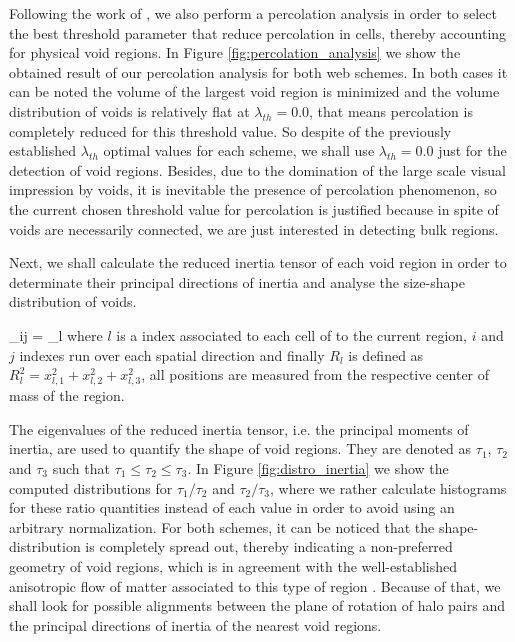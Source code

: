 \documentclass[usenatbib]{latex/mn2e}
\begin{document}
Following the work of , we also perform a 
percolation analysis in order to select the best threshold parameter that
reduce percolation in cells, thereby accounting for physical void regions.
In Figure \ref{fig:percolation_analysis} we show the obtained result 
of our percolation analysis for both web schemes. In both cases it can be 
noted the volume of the largest void region is minimized and the volume 
distribution of voids is relatively flat at $\lambda_{th} = 0.0$, that 
means percolation is completely reduced for this threshold value. So 
despite of the previously established $\lambda_{th}$ optimal values for 
each scheme, we shall use $\lambda_{th} = 0.0$ just for the detection of 
void regions. Besides, due to the domination of the large scale visual 
impression by voids, it is inevitable the presence of percolation 
phenomenon, so the current chosen threshold value for percolation is 
justified because in spite of voids are necessarily connected, we are just 
interested in detecting bulk regions.



Next, we shall calculate the reduced inertia tensor of each void region 
in order to determinate their principal directions of inertia and analyse 
the size-shape distribution of voids.


{ \tau_{ij} = \sum_l  }
where $l$ is a index associated to each cell of to the current region, 
$i$ and $j$ indexes run over each spatial direction and finally 
$R_l$ is defined as $R_l^2 = x_{l,1}^2 + x_{l,2}^2 + x_{l,3}^2$, all 
positions are measured from the respective center of mass of the region.



The eigenvalues of the reduced inertia tensor, i.e. the principal moments
of inertia, are used to quantify the shape of void regions. They are 
denoted as $\tau_1$, $\tau_2$ and $\tau_3$ such that $\tau_1 \leq \tau_2
\leq \tau_3$. In Figure \ref{fig:distro_inertia} we show the computed
distributions for $\tau_1/\tau_2$ and $\tau_2/\tau_3$, where we rather 
calculate histograms for these ratio quantities instead of each value in 
order to avoid using an arbitrary normalization. For both schemes, it can 
be noticed that the shape-distribution is completely spread out, thereby 
indicating a non-preferred geometry of void regions, which is in agreement 
with the well-established anisotropic flow of matter associated to this 
type of region . Because of that, we shall look 
for possible alignments between the plane of rotation of halo pairs and
the principal directions of inertia of the nearest void regions.
\end{document}
